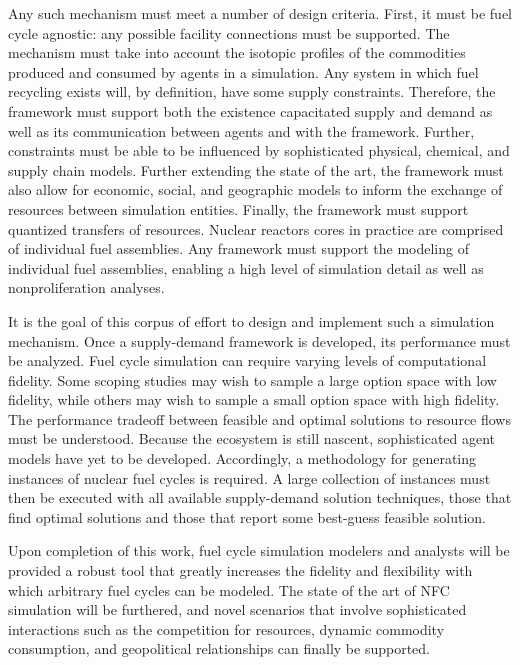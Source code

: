 Any such mechanism must meet a number of design criteria. First, it must be fuel
cycle agnostic: any possible facility connections must be supported. The
mechanism must take into account the isotopic profiles of the commodities
produced and consumed by agents in a simulation. Any system in which fuel
recycling exists will, by definition, have some supply constraints. Therefore,
the framework must support both the existence capacitated supply and demand as
well as its communication between agents and with the framework. Further,
constraints must be able to be influenced by sophisticated physical, chemical,
and supply chain models. Further extending the state of the art, the framework
must also allow for economic, social, and geographic models to inform the
exchange of resources between simulation entities. Finally, the framework must
support quantized transfers of resources. Nuclear reactors cores in practice are
comprised of individual fuel assemblies. Any framework must support the modeling
of individual fuel assemblies, enabling a high level of simulation detail as
well as nonproliferation analyses.

It is the goal of this corpus of effort to design and implement such a
simulation mechanism.  Once a supply-demand framework is developed, its
performance must be analyzed. Fuel cycle simulation can require varying levels
of computational fidelity. Some scoping studies may wish to sample a large
option space with low fidelity, while others may wish to sample a small option
space with high fidelity. The performance tradeoff between feasible and optimal
solutions to resource flows must be understood. Because the \Cyclus ecosystem is
still nascent, sophisticated agent models have yet to be developed. Accordingly,
a methodology for generating instances of nuclear fuel cycles is required. A
large collection of instances must then be executed with all available
supply-demand solution techniques, those that find optimal solutions and those
that report some best-guess feasible solution.

Upon completion of this work, fuel cycle simulation modelers and analysts will
be provided a robust tool that greatly increases the fidelity and flexibility
with which arbitrary fuel cycles can be modeled. The state of the art of NFC
simulation will be furthered, and novel scenarios that involve sophisticated
interactions such as the competition for resources, dynamic commodity
consumption, and geopolitical relationships can finally be supported.
